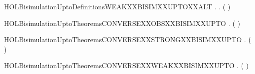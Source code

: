 \begin{SaveVerbatim}{HOLBisimulationUptoDefinitionsWEAKXXBISIMXXUPTOXXALT}
           \HOLSymConst{\HOLTokenForall{}}.
                \HOLTokenWeakTransBegin\HOLConst{\ensuremath{\tau}}\HOLTokenWeakTransEnd {} \HOLSymConst{\HOLTokenImp{}}
               \HOLSymConst{\HOLTokenExists{}}.
                      \HOLSymConst{\HOLTokenConj{}}
                   (    )  
\end{SaveVerbatim}
\newcommand{\HOLBisimulationUptoDefinitionsWEAKXXBISIMXXUPTOXXALT}{\UseVerbatim{HOLBisimulationUptoDefinitionsWEAKXXBISIMXXUPTOXXALT}}
\newcommand{\HOLBisimulationUptoDefinitions}{
\HOLDfnTag{BisimulationUpto}{OBS_BISIM_UPTO}\HOLBisimulationUptoDefinitionsOBSXXBISIMXXUPTO
\HOLDfnTag{BisimulationUpto}{STRONG_BISIM_UPTO}\HOLBisimulationUptoDefinitionsSTRONGXXBISIMXXUPTO
\HOLDfnTag{BisimulationUpto}{WEAK_BISIM_UPTO}\HOLBisimulationUptoDefinitionsWEAKXXBISIMXXUPTO
\HOLDfnTag{BisimulationUpto}{WEAK_BISIM_UPTO_ALT}\HOLBisimulationUptoDefinitionsWEAKXXBISIMXXUPTOXXALT
}
\begin{SaveVerbatim}{HOLBisimulationUptoTheoremsCONVERSEXXOBSXXBISIMXXUPTO}
\HOLTokenTurnstile{} \HOLSymConst{\HOLTokenForall{}}.   \HOLSymConst{\HOLTokenImp{}}  ( )
\end{SaveVerbatim}
\newcommand{\HOLBisimulationUptoTheoremsCONVERSEXXOBSXXBISIMXXUPTO}{\UseVerbatim{HOLBisimulationUptoTheoremsCONVERSEXXOBSXXBISIMXXUPTO}}
\begin{SaveVerbatim}{HOLBisimulationUptoTheoremsCONVERSEXXSTRONGXXBISIMXXUPTO}
\HOLTokenTurnstile{} \HOLSymConst{\HOLTokenForall{}}.
         \HOLSymConst{\HOLTokenImp{}}  ( )
\end{SaveVerbatim}
\newcommand{\HOLBisimulationUptoTheoremsCONVERSEXXSTRONGXXBISIMXXUPTO}{\UseVerbatim{HOLBisimulationUptoTheoremsCONVERSEXXSTRONGXXBISIMXXUPTO}}
\begin{SaveVerbatim}{HOLBisimulationUptoTheoremsCONVERSEXXWEAKXXBISIMXXUPTO}
\HOLTokenTurnstile{} \HOLSymConst{\HOLTokenForall{}}.   \HOLSymConst{\HOLTokenImp{}}  ( )
\end{SaveVerbatim}

